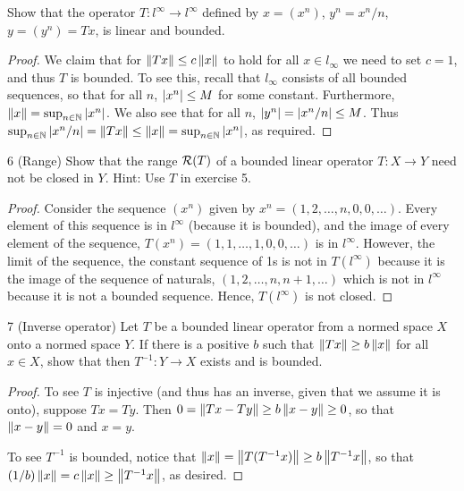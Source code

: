 \begin{exercise}{5}
Show that the operator $T:l^\infty\to l^\infty$ defined by $x=(x^n)$, $y^n=x^n/n$, $y =(y^n) =Tx$, is linear and bounded.
\end{exercise}
\begin{proof}
We claim that for $\left\lVert Tx\right\rVert\leq c\left\lVert x\right\rVert$ to hold for all $x\in l_\infty$ we need to set $c=1$, and thus $T$ is bounded. 
To see this, recall that $l_\infty$ consists of all bounded sequences, so that for all $n$, $\left\lvert x^n\right\rvert\leq M$ for some constant. 
Furthermore, $\left\lVert x\right\rVert=\sup_{n\in\mathbb{N}}\left\lvert x^n\right\rvert$. 
We also see that for all $n$, $\left\lvert y^n\right\rvert=\left\lvert x^n/n\right\rvert\leq M$. 
Thus $\sup_{n\in\mathbb{N}}\left\lvert x^n/n\right\rvert =\left\lVert Tx\right\rVert \leq\left\lVert x\right\rVert =\sup_{n\in\mathbb{N}}\left\lvert x^n\right\rvert$, as required.
\end{proof}

\begin{exercise}{6 (Range)}
Show that the range $\mathcal{R}(T)$ of a bounded linear operator $T:X\to Y$ need not be closed in $Y$. 
Hint: Use $T$ in exercise 5.
\end{exercise}
\begin{proof}
Consider the sequence $(x^n)$ given by $x^n=(1,2,\dots,n,0,0,\dots)$. 
Every element of this sequence is in $l^\infty$ (because it is bounded), and the image of every element of the sequence, $T(x^n)=(1,1,\dots,1,0,0,\dots)$ is in $l^\infty$. 
However, the limit of the sequence, the constant sequence of 1s is not in $T(l^\infty)$ because it is the image of the sequence of naturals, $(1,2,\dots,n,n+1,\dots)$ which is not in $l^\infty$ because it is not a bounded sequence.
Hence, $T(l^\infty)$ is not closed.
\end{proof}

\begin{exercise}{7 (Inverse operator)}
Let $T$ be a bounded linear operator from a normed space $X$ onto a normed space $Y$. 
If there is a positive $b$ such that $\left\lVert Tx\right\rVert\geq b\left\lVert x\right\rVert$ for all $x\in X$, show that then $T^{-1}:Y\to X$ exists and is bounded.
\end{exercise}
\begin{proof}
To see $T$ is injective (and thus has an inverse, given that we assume it is onto), suppose $Tx=Ty$.
Then $0 =\left\lVert Tx-Ty\right\rVert \geq b\left\lVert x-y\right\rVert\geq 0$, so that $\left\lVert x-y\right\rVert=0$ and $x=y$.

To see $T^{-1}$ is bounded, notice that $\left\lVert x\right\rVert =\left\lVert T(T^{-1}x)\right\rVert \geq b\left\lVert T^{-1}x\right\rVert$, so that $(1/b)\left\lVert x\right\rVert =c\left\lVert x\right\rVert \geq \left\lVert T^{-1}x\right\rVert$, as desired.
\end{proof}

